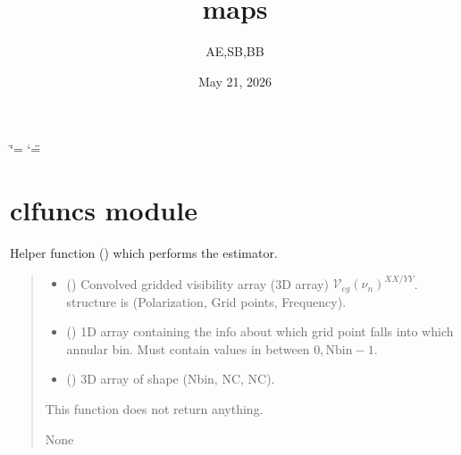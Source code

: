 \documentclass[a4paper,11pt,oneside,english,openany]{sphinxmanual}
\title{maps}
\date{May 21, 2026}
\author{AE,SB,BB}
\begin{document}
\ifdefined\shorthandoff
  \ifnum\catcode`\=\string=\active\shorthandoff{=}\fi
  \ifnum\catcode`\"=\active{}\fi
\fi

\pagestyle{empty}
\sphinxmaketitle
\pagestyle{plain}
\sphinxtableofcontents
\pagestyle{normal}
\label{\detokenize{index::doc}}
\sphinxstepscope



\sphinxstepscope


\chapter{clfuncs module}
\label{\detokenize{clfuncs:module-clfuncs}}\label{\detokenize{clfuncs:clfuncs-module}}\label{\detokenize{clfuncs::doc}}

\begin{fulllineitems}
\label{\detokenize{clfuncs:clfuncs.correlate_fast}}
\pysigstartsignatures
{}
\pysigstopsignatures
\sphinxAtStartPar
Helper function () which performs the  estimator.
\begin{quote}\begin{description}
\begin{itemize}
\item {} 
\sphinxAtStartPar
{} () \textendash{} Convolved gridded visibility array (3D array) \(\mathcal{V}_{cg}(\nu_n)^{XX/YY}\).  structure is (Polarization, Grid points, Frequency).

\item {} 
\sphinxAtStartPar
{} () \textendash{} 1D array containing the info about which grid point falls into which annular bin. Must contain values in between \(0,\textrm{Nbin}-1\).

\item {} 
\sphinxAtStartPar
{} () \textendash{} 3D array of shape (Nbin, NC, NC).

\end{itemize}

\sphinxAtStartPar
This function does not return anything.

\sphinxAtStartPar
None

\end{description}\end{quote}

\end{fulllineitems}
\end{document}
